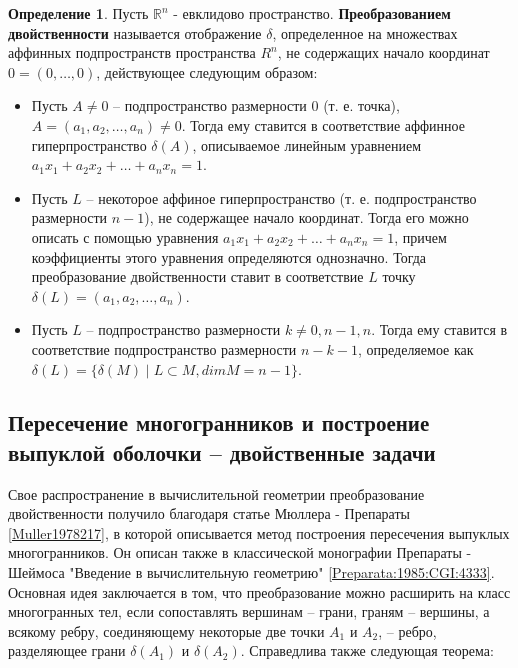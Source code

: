 \documentclass[a4paper, 12pt, titlepage]{article}
\theoremstyle{definition}
\newtheorem{SmartDefinition}{Определение}
\theoremstyle{plain}
\theoremstyle{plain}
\begin{document}
\begin{SmartDefinition}
 Пусть $\mathbb{R}^{n}$ - евклидово пространство. \textbf{Преобразованием 
двойственности} называется отображение $\delta$, определенное на множествах
аффинных подпространств пространства $R^{n}$, не содержащих начало координат
$0 = (0, \ldots, 0)$, действующее следующим образом:
\begin{itemize}
 \item Пусть $A \neq 0$ -- подпространство размерности $0$ (т. е. точка),
 $A = (a_{1}, a_{2}, \ldots, a_{n}) \neq 0$. Тогда ему ставится в
 соответствие аффинное гиперпространство $\delta(A)$, описываемое линейным
 уравнением $a_{1} x_{1} + a_{2} x_{2} + \ldots + a_{n} x_{n} = 1$.
 \item Пусть $L$ -- некоторое аффиное гиперпространство (т. е. 
 подпространство размерности $n - 1$), не содержащее начало координат. Тогда его
 можно описать с помощью уравнения
 $a_{1} x_{1} + a_{2} x_{2} + \ldots + a_{n} x_{n} = 1$, причем коэффициенты
 этого уравнения определяются однозначно. Тогда преобразование двойственности
 ставит в соответствие $L$ точку $\delta(L) = (a_{1}, a_{2}, \ldots, a_{n})$.
 \item Пусть $L$ -- подпространство размерности $k \neq 0, n - 1, n$. Тогда ему
 ставится в соответствие подпространство размерности $n - k - 1$, определяемое
 как $\delta(L) = \{\delta(M) \; | \; L \subset M, dim M = n - 1\}$.
\end{itemize}

\end{SmartDefinition}

\subsection{Пересечение многогранников и построение выпуклой оболочки --
двойственные задачи}

Свое распространение в вычислительной геометрии преобразование двойственности
получило благодаря статье Мюллера - Препараты \ref{Muller1978217}, в которой
описывается метод построения пересечения выпуклых многогранников. Он описан
также в классической монографии Препараты - Шеймоса "Введение в вычислительную
геометрию" \ref{Preparata:1985:CGI:4333}. Основная идея заключается в том, что
преобразование можно расширить на класс многогранных тел, если сопоставлять
вершинам -- грани, граням -- вершины, а всякому ребру, соединяющему некоторые
две точки $A_{1}$ и $A_{2}$, -- ребро, разделяющее грани $\delta(A_{1})$ и
$\delta(A_{2})$. Справедлива также следующая теорема:
\end{document}
